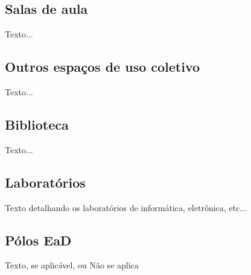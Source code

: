 \subsection{Salas de aula}
Texto...

\subsection{Outros espaços de uso coletivo}
Texto...

\subsection{Biblioteca}
Texto...

\subsection{Laboratórios}
Texto detalhando os laboratórios de informática, eletrônica, etc...

\subsection{Pólos EaD}
Texto, se aplicável, ou Não se aplica